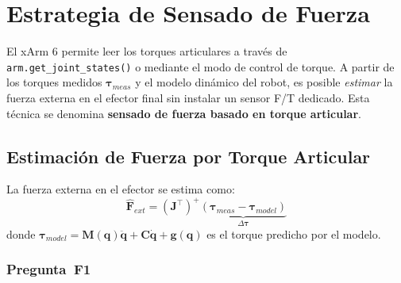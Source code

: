 \documentclass[journal,10pt,twoside]{IEEEtran}
\begin{document}
\section{Estrategia de Sensado de Fuerza}
\label{sec:force}

\begin{theorybox}
  El xArm 6 permite leer los torques articulares a través de
  \texttt{arm.get\_joint\_states()} o mediante el modo de control de
  torque. A partir de los torques medidos $\bm{\tau}_{meas}$ y el
  modelo dinámico del robot, es posible \emph{estimar} la fuerza
  externa en el efector final sin instalar un sensor F/T dedicado.
  Esta técnica se denomina \textbf{sensado de fuerza basado en torque articular}.
\end{theorybox}

\subsection{Estimación de Fuerza por Torque Articular}

La fuerza externa en el efector se estima como:
\begin{equation}
  \hat{\bm{F}}_{ext} = \left(\bm{J}^\top\right)^+
    \underbrace{\left(\bm{\tau}_{meas} - \bm{\tau}_{model}\right)}_{\Delta\bm{\tau}}
  \label{eq:force_estimate}
\end{equation}
donde $\bm{\tau}_{model} = \bm{M}(\bm{q})\ddot{\bm{q}} +
\bm{C}\dot{\bm{q}} + \bm{g}(\bm{q})$ es el torque predicho por el modelo.

\subsubsection*{Pregunta~F1}
\end{document}
